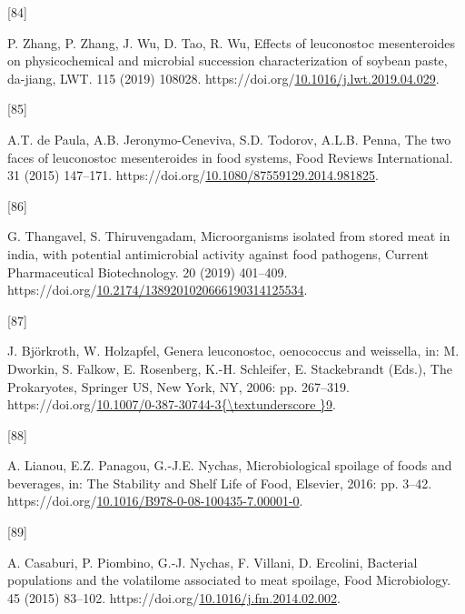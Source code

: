 \documentclass[preprint,3p,
a4paper]{elsarticle} %
\newlength{\cslhangindent}
\newlength{\csllabelwidth}
\newlength{\cslentryspacingunit} %
\newenvironment{CSLReferences}[2] %
 {%
  \setlength{\parindent}{0pt}
  \ifodd #1
  \let\oldpar\par
  \def\par{\hangindent=\cslhangindent\oldpar}
  \fi
  \setlength{\parskip}{#2\cslentryspacingunit}
 }%
 {}
\newcommand{\CSLLeftMargin}[1]{\parbox[t]{\csllabelwidth}{#1}}
\newcommand{\CSLRightInline}[1]{\parbox[t]{\linewidth - \csllabelwidth}{#1}\break}
\begin{document}
\begin{CSLReferences}{0}{0}
\leavevmode{}%
\CSLLeftMargin{{[}84{]} }%
\CSLRightInline{P. Zhang, P. Zhang, J. Wu, D. Tao, R. Wu, Effects of
leuconostoc mesenteroides on physicochemical and microbial succession
characterization of soybean paste, da-jiang, LWT. 115 (2019) 108028.
https://doi.org/\href{https://doi.org/10.1016/j.lwt.2019.04.029}{10.1016/j.lwt.2019.04.029}.}

\leavevmode{}%
\CSLLeftMargin{{[}85{]} }%
\CSLRightInline{A.T. de Paula, A.B. Jeronymo-Ceneviva, S.D. Todorov,
A.L.B. Penna, The two faces of leuconostoc mesenteroides in food
systems, Food Reviews International. 31 (2015) 147--171.
https://doi.org/\href{https://doi.org/10.1080/87559129.2014.981825}{10.1080/87559129.2014.981825}.}

\leavevmode{}%
\CSLLeftMargin{{[}86{]} }%
\CSLRightInline{G. Thangavel, S. Thiruvengadam, Microorganisms isolated
from stored meat in india, with potential antimicrobial activity against
food pathogens, Current Pharmaceutical Biotechnology. 20 (2019)
401--409.
https://doi.org/\href{https://doi.org/10.2174/1389201020666190314125534}{10.2174/1389201020666190314125534}.}

\leavevmode{}%
\CSLLeftMargin{{[}87{]} }%
\CSLRightInline{J. Björkroth, W. Holzapfel, Genera leuconostoc,
oenococcus and weissella, in: M. Dworkin, S. Falkow, E. Rosenberg, K.-H.
Schleifer, E. Stackebrandt (Eds.), The Prokaryotes, {Springer US}, New
York, NY, 2006: pp. 267--319.
https://doi.org/\href{https://doi.org/10.1007/0-387-30744-3\%7B/textunderscore\%20\%7D9}{10.1007/0-387-30744-3\{\textbackslash textunderscore
\}9}.}

\leavevmode{}%
\CSLLeftMargin{{[}88{]} }%
\CSLRightInline{A. Lianou, E.Z. Panagou, G.-J.E. Nychas, Microbiological
spoilage of foods and beverages, in: The Stability and Shelf Life of
Food, Elsevier, 2016: pp. 3--42.
https://doi.org/\href{https://doi.org/10.1016/B978-0-08-100435-7.00001-0}{10.1016/B978-0-08-100435-7.00001-0}.}

\leavevmode{}%
\CSLLeftMargin{{[}89{]} }%
\CSLRightInline{A. Casaburi, P. Piombino, G.-J. Nychas, F. Villani, D.
Ercolini, Bacterial populations and the volatilome associated to meat
spoilage, Food Microbiology. 45 (2015) 83--102.
https://doi.org/\href{https://doi.org/10.1016/j.fm.2014.02.002}{10.1016/j.fm.2014.02.002}.}


\end{CSLReferences}
\end{document}
